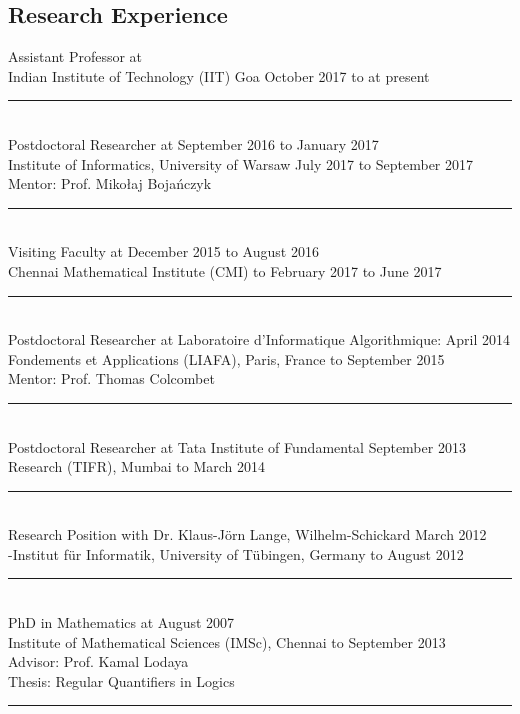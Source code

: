 \documentclass[margin]{res}
\begin{document}
\begin{resume}
\section{Research Experience} 
					Assistant Professor at \\
					Indian Institute of Technology (IIT) Goa \hfill October 2017 to at present \\
					\noindent\rule{13cm}{0.4pt} \\
					Postdoctoral Researcher at \hfill  \hfill September 2016 to January 2017 \\
					Institute of Informatics, University of Warsaw \hfill July 2017 to September 2017 \\
					Mentor: Prof. Miko\l{}aj Boja\'nczyk \\
					\noindent\rule{13cm}{0.4pt} \\
					Visiting Faculty at 	\hfill December 2015 to August 2016 \\
					Chennai Mathematical Institute (CMI)  \hfill to February 2017 to June 2017 \\
					\noindent\rule{13cm}{0.4pt} \\
					Postdoctoral Researcher  at Laboratoire d{'}Informatique Algorithmique: \hfill April 2014\\
					Fondements et Applications (LIAFA),	Paris, France \hfill to September 2015 \\
					Mentor: Prof. Thomas Colcombet \\
					\noindent\rule{13cm}{0.4pt} \\
					Postdoctoral Researcher  at Tata Institute of  Fundamental \hfill September 2013 \\
					Research (TIFR), Mumbai	\hfill	to March 2014
					\noindent\rule{13cm}{0.4pt} \\					
					Research Position with Dr. Klaus-J\"orn Lange, Wilhelm-Schickard \hfill March 2012\\
					-Institut f\"ur Informatik, University of T\"ubingen, Germany \hfill to August 2012 
					\noindent\rule{13cm}{0.4pt} \\
					PhD in Mathematics at \hfill August 2007\\
					Institute of Mathematical Sciences (IMSc), Chennai \hfill to September 2013\\
					Advisor: Prof. Kamal Lodaya  \\
					Thesis: Regular Quantifiers in Logics  \\
					\noindent\rule{13cm}{0.4pt} 

									

\end{resume}
\end{document}
